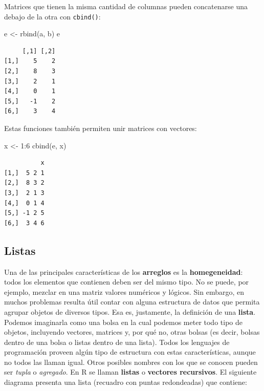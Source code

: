\documentclass[
]{book}
\newenvironment{Shaded}{\begin{snugshade}}{\end{snugshade}}
\newcommand{\DecValTok}[1]{\textcolor[rgb]{0.00,0.00,0.81}{#1}}
\newcommand{\FunctionTok}[1]{\textcolor[rgb]{0.00,0.00,0.00}{#1}}
\newcommand{\NormalTok}[1]{#1}
\newcommand{\OtherTok}[1]{\textcolor[rgb]{0.56,0.35,0.01}{#1}}
\newcommand{\SpecialCharTok}[1]{\textcolor[rgb]{0.00,0.00,0.00}{#1}}
\begin{document}
Matrices que tienen la misma cantidad de columnas pueden concatenarse una debajo de la otra con \texttt{cbind()}:

\begin{Shaded}
\begin{Highlighting}[]
\NormalTok{e }\OtherTok{\textless{}{-}} \FunctionTok{rbind}\NormalTok{(a, b)}
\NormalTok{e}
\end{Highlighting}
\end{Shaded}

\begin{verbatim}
     [,1] [,2]
[1,]    5    2
[2,]    8    3
[3,]    2    1
[4,]    0    1
[5,]   -1    2
[6,]    3    4
\end{verbatim}

Estas funciones también permiten unir matrices con vectores:

\begin{Shaded}
\begin{Highlighting}[]
\NormalTok{x }\OtherTok{\textless{}{-}} \DecValTok{1}\SpecialCharTok{:}\DecValTok{6}
\FunctionTok{cbind}\NormalTok{(e, x)}
\end{Highlighting}
\end{Shaded}

\begin{verbatim}
          x
[1,]  5 2 1
[2,]  8 3 2
[3,]  2 1 3
[4,]  0 1 4
[5,] -1 2 5
[6,]  3 4 6
\end{verbatim}

\hypertarget{listas}{%
\subsection{Listas}\label{listas}}

Una de las principales características de los \textbf{arreglos} es la \textbf{homegeneidad}: todos los elementos que contienen deben ser del mismo tipo. No se puede, por ejemplo, mezclar en una matriz valores numéricos y lógicos. Sin embargo, en muchos problemas resulta útil contar con alguna estructura de datos que permita agrupar objetos de diversos tipos. Esa es, justamente, la definición de una \textbf{lista}. Podemos imaginarla como una bolsa en la cual podemos meter todo tipo de objetos, incluyendo vectores, matrices y, por qué no, otras bolsas (es decir, bolsas dentro de una bolsa o listas dentro de una lista). Todos los lenguajes de programación proveen algún tipo de estructura con estas características, aunque no todos las llaman igual. Otros posibles nombres con los que se conocen pueden ser \emph{tupla} o \emph{agregado}. En R se llaman \textbf{listas} o \textbf{vectores recursivos}. El siguiente diagrama presenta una lista (recuadro con puntas redondeadas) que contiene:
\end{document}
